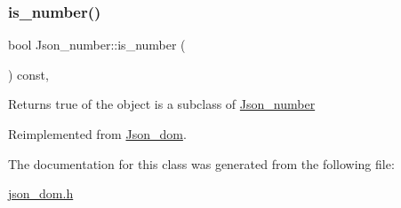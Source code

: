 \subsubsection{\texorpdfstring{is\+\_\+number()}{is\_number()}}
{\footnotesize\ttfamily bool Json\+\_\+number\+::is\+\_\+number (\begin{DoxyParamCaption}{ }\end{DoxyParamCaption}) const\hspace{0.3cm}{\ttfamily [inline]}, {\ttfamily [virtual]}}

\begin{DoxyReturn}{Returns}
true of the object is a subclass of \mbox{\hyperlink{classJson__number}{Json\+\_\+number}} 
\end{DoxyReturn}


Reimplemented from \mbox{\hyperlink{classJson__dom_ab94257c625c7d77556fd3bf58c961187}{Json\+\_\+dom}}.



The documentation for this class was generated from the following file\+:\begin{DoxyCompactItemize}
\item 
\mbox{\hyperlink{json__dom_8h}{json\+\_\+dom.\+h}}\end{DoxyCompactItemize}
